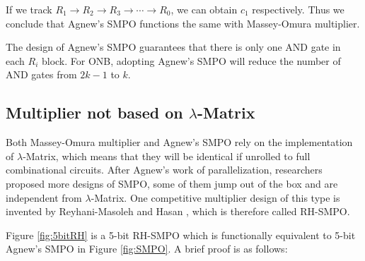 \begin{Example}
If we track $R_1\to R_2\to R_3 \to \cdots \to R_0$, we can obtain $c_1$ respectively.
Thus we conclude that Agnew's SMPO functions the same with Massey-Omura multiplier.
\end{Example}

The design of Agnew's SMPO guarantees that there is only one AND gate in each $R_i$ block.
For ONB, adopting Agnew's SMPO will reduce the number of AND gates from $2k-1$ to $k$.

\subsection{Multiplier not based on $\lambda$-Matrix}
Both Massey-Omura multiplier and Agnew's SMPO rely on the implementation of $\lambda$-Matrix,
which means that they will be identical if unrolled to full combinational circuits. 
After Agnew's work of parallelization, researchers proposed more designs of SMPO, 
some of them jump out of the box and are independent from $\lambda$-Matrix.
One competitive multiplier design of this type is invented by Reyhani-Masoleh and Hasan 
\cite{RHmulti}, which is therefore called RH-SMPO.

\begin{figure}[H]
\end{figure}

Figure \ref{fig:5bitRH} is a 5-bit RH-SMPO which is functionally equivalent to 5-bit Agnew's SMPO 
in Figure \ref{fig:SMPO}. A brief proof is as follows: 

